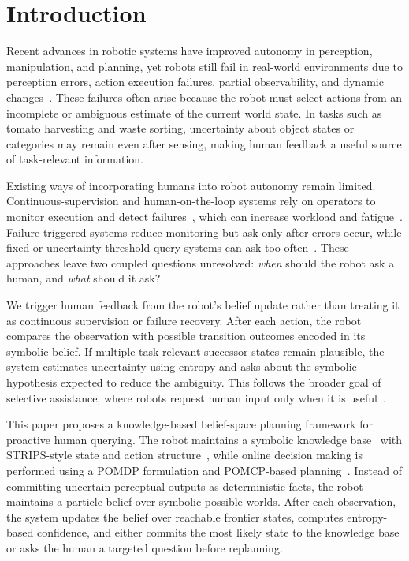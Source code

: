 \section{Introduction}
\label{sec:introduction}

Recent advances in robotic systems have improved autonomy in perception, manipulation, and planning, yet robots still fail in real-world environments due to perception errors, action execution failures, partial observability, and dynamic changes~\cite{kaipa2016addressing,kaelbling1998planning,kurniawati2016online}. These failures often arise because the robot must select actions from an incomplete or ambiguous estimate of the current world state. In tasks such as tomato harvesting and waste sorting, uncertainty about object states or categories may remain even after sensing, making human feedback a useful source of task-relevant information.

Existing ways of incorporating humans into robot autonomy remain limited. Continuous-supervision and human-on-the-loop systems rely on operators to monitor execution and detect failures~\cite{goodrich2008human,dragan2013legibility,scharre2015introduction,nahavandi2017trusted}, which can increase workload and fatigue~\cite{chen2014human,endsley2018automation,wong2017workload}. Failure-triggered systems reduce monitoring but ask only after errors occur, while fixed or uncertainty-threshold query systems can ask too often~\cite{knowno2023,liang2024introspective,mullen2025lbap}. These approaches leave two coupled questions unresolved: \textit{when} should the robot ask a human, and \textit{what} should it ask?

We trigger human feedback from the robot's belief update rather than treating it as continuous supervision or failure recovery. After each action, the robot compares the observation with possible transition outcomes encoded in its symbolic belief. If multiple task-relevant successor states remain plausible, the system estimates uncertainty using entropy and asks about the symbolic hypothesis expected to reduce the ambiguity. This follows the broader goal of selective assistance, where robots request human input only when it is useful~\cite{sadigh2017active,baraglia2017efficient,leusmann2023understanding}.

This paper proposes a knowledge-based belief-space planning framework for proactive human querying. The robot maintains a symbolic knowledge base~\cite{davis1993knowledge} with STRIPS-style state and action structure~\cite{fikes1971strips}, while online decision making is performed using a POMDP formulation and POMCP-based planning~\cite{kaelbling1998planning,silver2010monte}. Instead of committing uncertain perceptual outputs as deterministic facts, the robot maintains a particle belief over symbolic possible worlds. After each observation, the system updates the belief over reachable frontier states, computes entropy-based confidence, and either commits the most likely state to the knowledge base or asks the human a targeted question before replanning.

